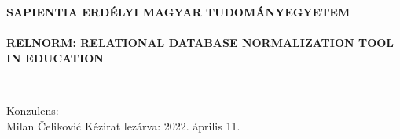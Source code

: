 \newpage
{}
\linespread{1}

\begin{center}
    {\bfseries
    \vspace*{1.5cm}
    \large{SAPIENTIA ERDÉLYI MAGYAR TUDOMÁNYEGYETEM} \\\vspace{2.5cm}
    \large{\@title} \\ \vspace{1.5cm}
    \large{RELNORM: RELATIONAL DATABASE NORMALIZATION TOOL IN EDUCATION} \\ \vspace{2cm}
    }
    \large{
    \@author \\ \vspace{2cm}
    
    Konzulens: \\
    Milan Čeliković
    \vfill
    Kézirat lezárva: 2022. április 11.
    }
\end{center}